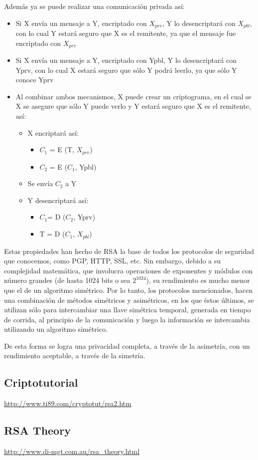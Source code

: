 Además ya se puede realizar una comunicación privada así:
\begin{itemize}
\item Si X envía un mensaje a Y, encriptado con $X_{prv}$, Y lo
  desencriptará con $X_{pbl}$, con lo cual Y estará seguro que X es el
  remitente, ya que el mensaje fue encriptado con $X_{prv}$
\item Si X envía un mensaje a Y, encriptado con Ypbl, Y lo
  desencriptará con Yprv, con lo cual X estará seguro que sólo Y podrá
  leerlo, ya que sólo Y conoce Yprv
\item Al combinar ambos mecanismos, X puede crear un criptograma, en
  el cual se X se asegure que sólo Y puede verlo y Y estará seguro que
  X es el remitente, así:
  \begin{itemize}
  \item X encriptará así:
    \begin{itemize}
    \item $C_1$ = E (T, $X_{prv}$)
    \item $C_2$ = E ($C_1$, Ypbl)
    \end{itemize}
  \item Se envía $C_2$ a Y
  \item Y desencriptará así:
    \begin{itemize}
    \item $C_1$= D ($C_2$, Yprv)
    \item T = D ($C_1$, $X_{pbl}$)
    \end{itemize}
  \end{itemize}
\end{itemize}

Estas propiedades han hecho de RSA la base de todos los protocolos de
seguridad que conocemos, como PGP, HTTP, SSL, etc.  Sin embargo,
debido a su complejidad matemática, que involucra operaciones de
exponentes y módulos con número grandes (de hasta 1024 bits o sea
$2^{1024}$), su rendimiento es mucho menor que el de un algoritmo
simétrico.  Por lo tanto, los protocolos mencionados, hacen una
combinación de métodos simétricos y asimétricos, en los que éstos
últimos, se utilizan sólo para intercambiar una llave simétrica
temporal, generada en tiempo de corrida, al principio de la
comunicación y luego la información se intercambia utilizando un
algoritmo simétrico.


De esta forma se logra una privacidad completa, a través de la
asimetría, con un rendimiento aceptable, a través de la simetría.

\subsection{Criptotutorial}
\label{sec:criptotutorial}

\url{http://www.ti89.com/cryptotut/rsa2.htm}

\subsection{RSA Theory}
\label{sec:rsa-theory}
\url{http://www.di-mgt.com.au/rsa_theory.html}


